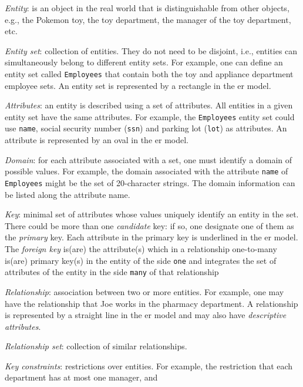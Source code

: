 \begin{item-c}
\item \emph{Entity}: is an object in the real world that is distinguishable from
  other objects, e.g., the Pokemon toy, the toy department, the manager of the
  toy department, etc.
\item \emph{Entity set}: collection of entities. They do not need to be
  disjoint, i.e., entities can simultaneously belong to different entity
  sets. For example, one can define an entity set called \texttt{Employees} that
  contain both the toy and appliance department employee sets.
  An entity set is represented by a rectangle in the \gls{er} model.
\item \emph{Attributes}: an entity is described using a set of attributes. All
  entities in a given entity set have the same attributes. For example, the
  \texttt{Employees} entity set could use \texttt{name}, social security number
  (\texttt{ssn}) and parking lot (\texttt{lot}) as attributes.
  An attribute is represented by an oval in the \gls{er} model.
\item \emph{Domain}: for each attribute associated with a set, one must identify
  a domain of possible values. For example, the domain associated with the
  attribute \texttt{name} of \texttt{Employees} might be the set of 20-character
  strings.
  The domain information can be listed along the attribute name.
\item \emph{Key}: minimal set of attributes whose values uniquely identify an
  entity in the set. There could be more than one \emph{candidate} key: if so,
  one designate one of them as the \emph{primary} key.
  Each attribute in the primary key is underlined in the \gls{er} model. The
  \emph{foreign key} is(are) the
  attribute(s) which in a relationship one-to-many is(are) primary key(s) in the
  entity of the side \texttt{one} and integrates the set of attributes of the
  entity in the side \texttt{many} of that relationship
\item \emph{Relationship}: association between two or more entities.
  For example, one may have the relationship that Joe works in the pharmacy
  department.
  A relationship is represented by a straight line in the \gls{er} model and may
  also have \emph{descriptive attributes}.
\item \emph{Relationship set}: collection of similar relationships.
\item \emph{Key constraints}: restrictions over entities.
  For example, the restriction that each department has at most one manager, and

\end{item-c}
